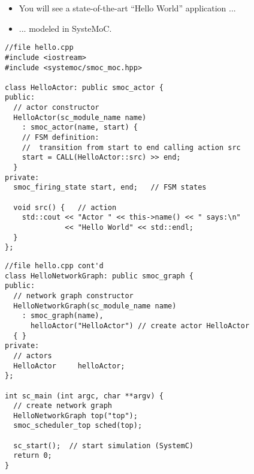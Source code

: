 \begin{frame}
\begin{itemize}
\item You will see a state-of-the-art ``Hello World'' application ...
\item ...  modeled in SysteMoC.
\end{itemize}
\end{frame}




\begin{frame}[fragile=singleslide]
\begin{lstlisting}
//file hello.cpp
#include <iostream>
#include <systemoc/smoc_moc.hpp>

class HelloActor: public smoc_actor {
public:
  // actor constructor
  HelloActor(sc_module_name name)
    : smoc_actor(name, start) {
    // FSM definition:
    //  transition from start to end calling action src
    start = CALL(HelloActor::src) >> end;
  }
private:
  smoc_firing_state start, end;   // FSM states

  void src() {   // action
    std::cout << "Actor " << this->name() << " says:\n"
              << "Hello World" << std::endl;
  }
};
\end{lstlisting}
\end{frame}

\begin{frame}[fragile=singleslide]
\begin{lstlisting}
//file hello.cpp cont'd
class HelloNetworkGraph: public smoc_graph {
public:
  // network graph constructor
  HelloNetworkGraph(sc_module_name name)
    : smoc_graph(name),
      helloActor("HelloActor") // create actor HelloActor
  { }
private:
  // actors
  HelloActor     helloActor;
};

int sc_main (int argc, char **argv) {
  // create network graph
  HelloNetworkGraph top("top");
  smoc_scheduler_top sched(top);

  sc_start();  // start simulation (SystemC)
  return 0;
}
\end{lstlisting}
\end{frame}

